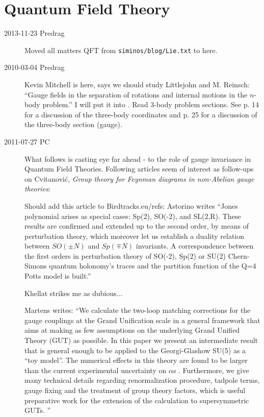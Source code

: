 \section{Quantum Field Theory}
\label{sect:QFT}

\begin{description}
\item[2013-11-23  Predrag] Moved all matters QFT from
\texttt{siminos/blog/Lie.txt} to here.

\item[2010-03-04 Predrag]
Kevin Mitchell is here, says we should study Littlejohn and
M. Reinsch: ``Gauge fields in the separation of
rotations and internal motions in the $n$-body problem.'' I
will put it into . Read 3-body problem
sections. See p. 14 for a discussion of the three-body
coordinates and p. 25 for a discussion of the three-body
section (gauge).



\item[2011-07-27 PC]
What follows is casting eye far ahead - to the role of gauge invariance
in Quantum Field Theories.
Following articles seem of interest as follow-ups on
Cvitanovi\'c, {\em Group theory for {Feynman} diagrams in
non-{Abelian} gauge theories}:

Should add this article to Birdtracks.eu/refs: Astorino
writes ``Jones polynomial arises as special cases: Sp(2), SO(-2), and
SL(2,R). These results are confirmed and extended up to the second order,
by means of perturbation theory, which moreover let us establish a
duality relation between $SO(\pm N)$ and $Sp(\mp N)$ invariants. A
correspondence between the first orders in perturbation theory of SO(-2),
Sp(2) or SU(2) Chern-Simons quantum holonomy's traces and the partition
function of the Q=4 Potts model is built.''

Khellat strikes me as dubious...

Martens writes: ``We calculate the two-loop matching corrections for the
   gauge couplings at the Grand Unification scale in a general framework
   that aims at making as few assumptions on the underlying Grand Unified
   Theory (GUT) as possible. In this paper we present an intermediate
   result that is general enough to be applied to the Georgi-Glashow
   SU(5) as a ``toy model''. The numerical effects in this theory are
   found to be larger than the current experimental uncertainty on $\alpha$s .
   Furthermore, we give many technical details regarding renormalization
   procedure, tadpole terms, gauge fixing and the treatment of group
   theory factors, which is useful preparative work for the extension of
   the calculation to supersymmetric GUTs.
   ''


\end{description}
